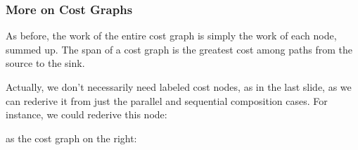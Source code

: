 \documentclass[aspectratio=169]{beamer}
\newcommand{\hex}[4][]{\node[hex, #1, minimum size=1cm] (#2) {$W$: #3 \\ $S$: #4}}
\begin{document}
\begin{frame}[fragile]
  \frametitle{More on Cost Graphs}

  \begin{center}
  \begin{minipage}{0.65\textwidth}
    \raggedright
    As before, the work of the entire cost graph is simply the work of each
    node, summed up. The span of a cost graph is the greatest cost among
    paths from the source to the sink.

    \vspace{10pt}

    Actually, we don't necessarily need labeled cost nodes, as in the last
    slide, as we can rederive it from just the parallel and sequential
    composition cases. For instance, we could rederive this node:

    \vspace{5pt}

    \begin{center}
    \end{center}

   \vspace{5pt}

   as the cost graph on the right:
  \end{minipage}
  \hfill
  \begin{minipage}{0.34\textwidth}
    \centering
  \end{minipage}
  \end{center}
\end{frame}
\end{document}
